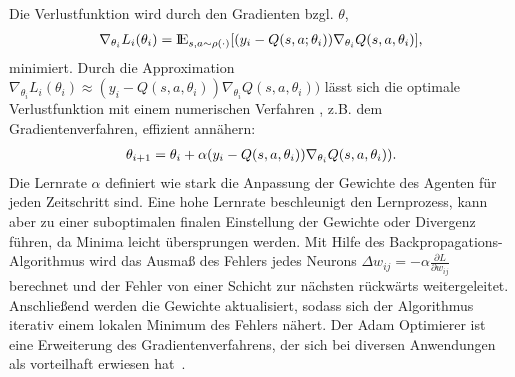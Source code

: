 Die Verlustfunktion wird durch den Gradienten bzgl. $\theta$,
\begin{align}
	\nabla_{\theta_i}L_i(\theta_i)=\mbox{I\negthinspace E} _{s,a\sim\rho(\cdot)}[(y_i - Q(s,a;\theta_i))\nabla_{\theta_i}Q(s,a,\theta_i)]\textnormal{,}
\end{align}
minimiert.
Durch die Approximation $\nabla_{\theta_i}L_i(\theta_i)\approx (y_i - Q(s, a,\theta_i))\nabla_{\theta_i}Q(s, a,\theta_i))$ lässt sich die optimale Verlustfunktion mit einem numerischen Verfahren \parencite{hahn}, z.B. dem Gradientenverfahren, effizient annähern:
\begin{align}
\label{gradientenverfahren}
	\theta_{i+1} = \theta_i+\alpha(y_i - Q(s, a,\theta_i))\nabla_{\theta_i}Q(s, a,\theta_i))
	\textnormal{.}
\end{align}
Die Lernrate $\alpha$ definiert wie stark die Anpassung der Gewichte des Agenten für jeden Zeitschritt sind. Eine hohe Lernrate beschleunigt den Lernprozess, kann aber zu einer suboptimalen finalen Einstellung der Gewichte oder Divergenz führen, da Minima leicht übersprungen werden.
Mit Hilfe des Backpropagations-Algorithmus wird das Ausmaß des Fehlers jedes Neurons $\Delta w_{ij}=-\alpha\frac{\partial L}{\partial w_{ij}}$ berechnet und der Fehler von einer Schicht zur nächsten rückwärts weitergeleitet.
Anschließend werden die Gewichte aktualisiert, sodass sich der Algorithmus iterativ einem lokalen Minimum des Fehlers nähert.
Der Adam Optimierer ist eine Erweiterung des Gradientenverfahrens, der sich bei diversen Anwendungen als vorteilhaft erwiesen hat~\parencite{kingma2017adam}.


